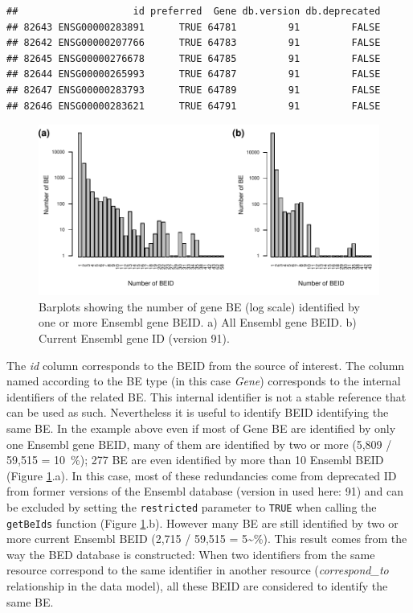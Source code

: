 \documentclass[9pt,a4paper,]{extarticle}
\theoremstyle{definition}
\theoremstyle{definition}
\theoremstyle{definition}
\theoremstyle{remark}
\begin{document}
\begin{verbatim}
##                    id preferred  Gene db.version db.deprecated
## 82643 ENSG00000283891      TRUE 64781         91         FALSE
## 82642 ENSG00000207766      TRUE 64783         91         FALSE
## 82645 ENSG00000276678      TRUE 64785         91         FALSE
## 82644 ENSG00000265993      TRUE 64787         91         FALSE
## 82647 ENSG00000283793      TRUE 64789         91         FALSE
## 82646 ENSG00000283621      TRUE 64791         91         FALSE
\end{verbatim}

\begin{figure}

{\centering \includegraphics[width=1\linewidth]{BED-F1000-Article_files/figure-latex/beidTables-1} 

}

\caption{Barplots showing the number of gene BE (log scale) identified by one or more Ensembl gene BEID. a) All Ensembl gene BEID. b) Current Ensembl gene ID (version 91).}\label{fig:beidTables}
\end{figure}

The \emph{id} column corresponds to the BEID from the source of interest.
The column named according to the BE type (in this case \emph{Gene})
corresponds to the internal identifiers of the related BE.
This internal identifier is not a stable reference that can be used as such.
Nevertheless it is useful to identify BEID identifying the
same BE.
In the example above even if most of Gene BE are identified by only
one Ensembl gene BEID, many of them are identified by two or more
(5,809
/ 59,515
= 10~\%);
277 BE
are even identified by more than 10 Ensembl BEID
(Figure \ref{fig:beidTables}.a).
In this case, most of these redundancies come from deprecated ID from former
versions of the Ensembl database (version in used here: 91)
and can be excluded by setting the \texttt{restricted} parameter to \texttt{TRUE} when calling
the \texttt{getBeIds} function (Figure \ref{fig:beidTables}.b).
However many BE are still identified by two or more current Ensembl BEID
(2,715
/ 59,515
= 5\textasciitilde{}\%).
This result comes from the way the BED database is constructed:
When two identifiers from the same resource correspond to the same identifier
in another resource (\emph{correspond\_to} relationship in the data model),
all these BEID are considered to identify the same BE.
\end{document}
